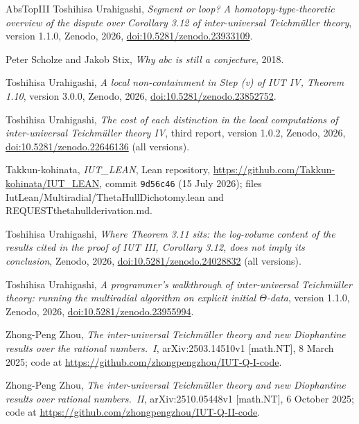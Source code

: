 \documentclass[11pt,a4paper]{article}
\newcommand{\leanus}{\textunderscore\allowbreak}
\newcommand{\lean}[1]{{\ttfamily\let\_\leanus #1}}
\begin{document}
\begin{thebibliography}{AbsTopIII}
Toshihisa Urahigashi, \emph{Segment or loop? A homotopy-type-theoretic overview of the dispute over Corollary 3.12 of
inter-universal {T}eichm\"uller theory}, version 1.1.0, Zenodo, 2026,
\href{https://doi.org/10.5281/zenodo.23933109}{doi:10.5281/zenodo.23933109}.

Peter Scholze and Jakob Stix, \emph{Why abc is still a conjecture}, 2018.

Toshihisa Urahigashi, \emph{A local non-containment in Step (v) of IUT IV, Theorem 1.10}, version 3.0.0, Zenodo, 2026,
\href{https://doi.org/10.5281/zenodo.23852752}{doi:10.5281/zenodo.23852752}.

Toshihisa Urahigashi, \emph{The cost of each distinction in the local computations of inter-universal {T}eichm\"uller
theory {IV}}, third report, version 1.0.2, Zenodo, 2026,
\href{https://doi.org/10.5281/zenodo.22646136}{doi:10.5281/zenodo.22646136} (all versions).

Takkun-kohinata, \emph{IUT\_LEAN}, Lean repository, \url{https://github.com/Takkun-kohinata/IUT_LEAN}, commit
\texttt{9d56c46} (15 July 2026); files \lean{IutLean/Multiradial/ThetaHullDichotomy.lean} and
\lean{REQUEST\_theta\_hull\_derivation.md}.

Toshihisa Urahigashi, \emph{Where Theorem 3.11 sits: the log-volume content of the results cited in the proof of IUT
III, Corollary 3.12, does not imply its conclusion}, Zenodo, 2026,
\href{https://doi.org/10.5281/zenodo.24028832}{doi:10.5281/zenodo.24028832} (all versions).

Toshihisa Urahigashi, \emph{A programmer's walkthrough of inter-universal {T}eichm\"uller theory: running the
multiradial algorithm on explicit initial $\Theta$-data}, version 1.1.0, Zenodo, 2026,
\href{https://doi.org/10.5281/zenodo.23955994}{doi:10.5281/zenodo.23955994}.

Zhong-Peng Zhou, \emph{The inter-universal {T}eichm\"uller theory and new {D}iophantine results over the rational
numbers.~I}, arXiv:2503.14510v1 [math.NT], 8 March 2025; code at \url{https://github.com/zhongpengzhou/IUT-Q-I-code}.

Zhong-Peng Zhou, \emph{The inter-universal {T}eichm\"uller theory and new {D}iophantine results over rational
numbers.~{II}}, arXiv:2510.05448v1 [math.NT], 6 October 2025; code at
\url{https://github.com/zhongpengzhou/IUT-Q-II-code}.
\end{thebibliography}
\end{document}
